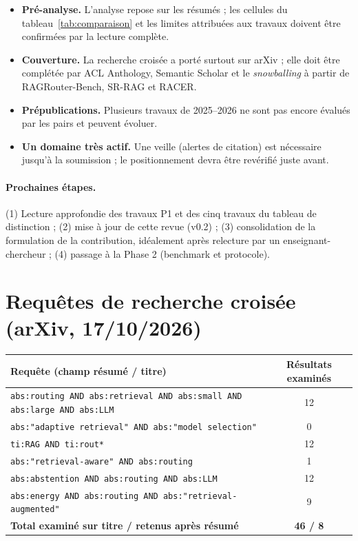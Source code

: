 \documentclass[11pt,a4paper]{article}
\begin{document}
\begin{itemize}
\item \textbf{Pré-analyse.} L'analyse repose sur les résumés ; les cellules du
tableau~\ref{tab:comparaison} et les limites attribuées aux travaux doivent être confirmées par la
lecture complète.
\item \textbf{Couverture.} La recherche croisée a porté surtout sur arXiv ; elle doit être complétée par
ACL Anthology, Semantic Scholar et le \textit{snowballing} à partir de RAGRouter-Bench, SR-RAG et RACER.
\item \textbf{Prépublications.} Plusieurs travaux de 2025--2026 ne sont pas encore évalués par les pairs
et peuvent évoluer.
\item \textbf{Un domaine très actif.} Une veille (alertes de citation) est nécessaire jusqu'à la
soumission ; le positionnement devra être revérifié juste avant.
\end{itemize}

\paragraph{Prochaines étapes.} (1) Lecture approfondie des travaux P1 et des cinq travaux du tableau de
distinction ; (2) mise à jour de cette revue (v0.2) ; (3) consolidation de la formulation de la
contribution, idéalement après relecture par un enseignant-chercheur ; (4) passage à la Phase 2 (benchmark et protocole).

\appendix
\section{Requêtes de recherche croisée (arXiv, 17/10/2026)}\label{ann:requetes}
\begin{center}\small
\begin{tabularx}{\textwidth}{Y c}
\toprule
\textbf{Requête (champ résumé / titre)} & \textbf{Résultats examinés} \\
\midrule
\texttt{abs:routing AND abs:retrieval AND abs:small AND abs:large AND abs:LLM} & 12 \\
\texttt{abs:"adaptive retrieval" AND abs:"model selection"} & 0 \\
\texttt{ti:RAG AND ti:rout*} & 12 \\
\texttt{abs:"retrieval-aware" AND abs:routing} & 1 \\
\texttt{abs:abstention AND abs:routing AND abs:LLM} & 12 \\
\texttt{abs:energy AND abs:routing AND abs:"retrieval-augmented"} & 9 \\
\midrule
\textbf{Total examiné sur titre / retenus après résumé} & \textbf{46 / 8} \\
\bottomrule
\end{tabularx}
\end{center}



\end{document}
